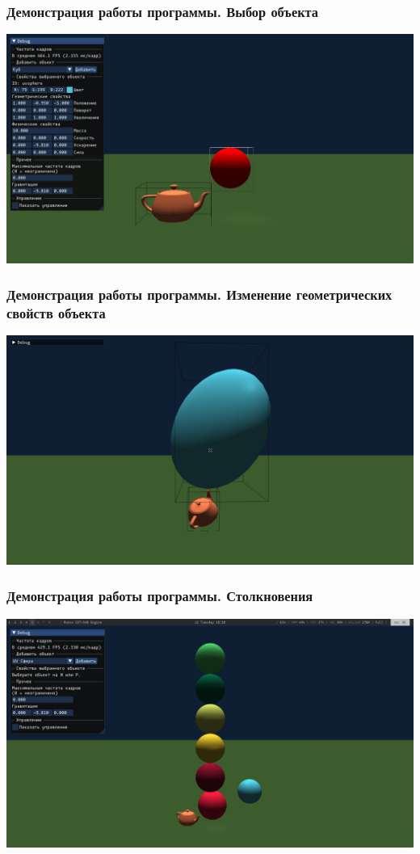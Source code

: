 \documentclass{beamer}
\begin{document}
\begin{frame}
\frametitle{Демонстрация работы программы. Выбор объекта}
\centering
\includegraphics[width=1\textwidth]{img/demo-select}
\end{frame}

\begin{frame}
\frametitle{Демонстрация работы программы. Изменение геометрических свойств объекта}
\centering
\includegraphics[width=1\textwidth]{img/demo-transform}
\end{frame}

\begin{frame}
\frametitle{Демонстрация работы программы. Столкновения}
\centering
\includegraphics[width=1\textwidth]{img/demo-nodbg}
\end{frame}
\end{document}
